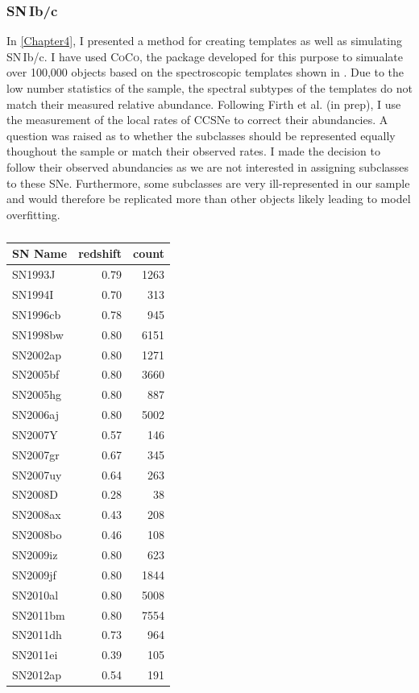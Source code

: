 \subsubsection{SN\,Ib/c}
In \cref{Chapter4}, I presented a method for creating templates as well as simulating SN\,Ib/c. I have used \textsc{CoCo}, the package developed for this purpose to simualate over 100,000 objects based on the spectroscopic templates shown in . Due to the low number statistics of the sample, the spectral subtypes of the templates do not match their measured relative abundance. Following Firth et al. (in prep), I use the \citet{Li2011} measurement of the local rates of CCSNe to correct their abundancies. A question was raised as to whether the subclasses should be represented equally thoughout the sample or match their observed rates. I made the decision to follow their observed abundancies as we are not interested in assigning subclasses to these SNe. Furthermore, some subclasses are very ill-represented in our sample and would therefore be replicated more than other objects likely leading to model overfitting.

\begin{table}
  \caption{}
  \label{tab:IbcTemplates}
  \centering
  \begin{tabular}{l|r|r}
    SN Name  & redshift & count \\
    \hline
    SN1993J  & 0.79 & 1263 \\
    SN1994I  & 0.70 &  313 \\
    SN1996cb & 0.78 &  945 \\
    SN1998bw & 0.80 & 6151 \\
    SN2002ap & 0.80 & 1271 \\
    SN2005bf & 0.80 & 3660 \\
    SN2005hg & 0.80 &  887 \\
    SN2006aj & 0.80 & 5002 \\
    SN2007Y  & 0.57 &  146 \\
    SN2007gr & 0.67 &  345 \\
    SN2007uy & 0.64 &  263 \\
    SN2008D  & 0.28 &   38 \\
    SN2008ax & 0.43 &  208 \\
    SN2008bo & 0.46 &  108 \\
    SN2009iz & 0.80 &  623 \\
    SN2009jf & 0.80 & 1844 \\
    SN2010al & 0.80 & 5008 \\
    SN2011bm & 0.80 & 7554 \\
    SN2011dh & 0.73 &  964 \\
    SN2011ei & 0.39 &  105 \\
    SN2012ap & 0.54 &  191 \\
    \hline
  \end{tabular}
\end{table}

